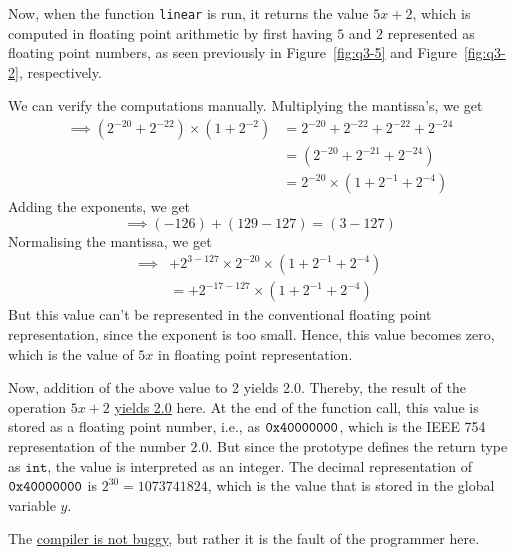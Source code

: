 Now, when the function \texttt{linear} is run, it returns the value \( 5x + 2 \), which is computed in floating point arithmetic by first having \( 5 \) and \( 2 \) represented as floating point numbers, as seen previously in Figure~\ref{fig:q3-5} and Figure~\ref{fig:q3-2}, respectively.

We can verify the computations  manually.
Multiplying the mantissa's, we get
\begin{align*}
    \implies
    (2^{-20} + 2^{-22}) \times (1 + 2^{-2})
     & =
    2^{-20} + 2^{-22} + 2^{-22} + 2^{-24}
    \\ & =
    (2^{-20} + 2^{-21}+ 2^{-24})
    \\ & =
    2^{-20} \times (1 + 2^{-1}+ 2^{-4})
\end{align*}
Adding the exponents, we get
\[
    \implies
    (-126) + (129 - 127)
    =
    (3 - 127)
\]
Normalising the mantissa, we get
\begin{align*}
    \implies
     &
    + 2^{3 - 127} \times 2^{-20} \times (1 + 2^{-1}+ 2^{-4})
    \\ & =
    + 2^{-17 - 127} \times (1 + 2^{-1}+ 2^{-4})
\end{align*}
But this value can't be represented in the conventional floating point representation, since the exponent is too small.
Hence, this value becomes zero, which is the value of \( 5x \) in floating point representation.

Now, addition of the above value to 2 yields 2.0.
Thereby, the result of the operation \( 5x + 2 \) \underline{yields 2.0} here.
At the end of the function call, this value is stored as a floating point number, i.e., as \( \texttt{0x40000000} \), which is the IEEE 754 representation of the number \( 2.0 \).
But since the prototype defines the return type as \( \texttt{int} \), the value is interpreted as an integer.
The decimal representation of \( \texttt{0x40000000} \) is \( 2^{30} = \boxed{1073741824} \), which is the value that is stored in the global variable \( y \).

The \underline{compiler is not buggy}, but rather it is the fault of the programmer here.
